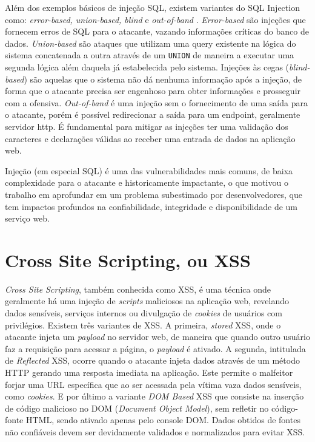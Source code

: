 Além dos exemplos básicos de injeção SQL, existem variantes \cite{bach_owasp2020understanding} do SQL Injection como: \textit{error-based, union-based, blind} e \textit{out-of-band} \cite{out_of_band_sql_invicti}. \textit{Error-based} são injeções que fornecem erros de SQL para o atacante, vazando informações críticas do banco de dados. \textit{Union-based} são ataques que utilizam uma query existente na lógica do sistema concatenada a outra através de um \verb+UNION+ de maneira a executar uma segunda lógica além daquela já estabelecida pelo sistema. Injeções às cegas (\textit{blind-based}) são aquelas que o sistema não dá nenhuma informação após a injeção, de forma que o atacante precisa ser engenhoso para obter informações e prosseguir com a ofensiva. \textit{Out-of-band} é uma injeção sem o fornecimento de uma saída para o atacante, porém é possível redirecionar a saída para um endpoint, geralmente servidor http.
É fundamental para mitigar as injeções ter uma validação dos caracteres e declarações válidas ao receber uma entrada de dados na aplicação web.

Injeção (em especial SQL) é uma das vulnerabilidades mais comuns, de baixa complexidade para o atacante e historicamente impactante, o que motivou o trabalho em aprofundar em um problema subestimado por desenvolvedores, que tem impactos profundos na confiabilidade, integridade e disponibilidade de um serviço web.

\section{Cross Site Scripting, ou XSS}
\textit{Cross Site Scripting}, também conhecida como XSS, é uma técnica onde geralmente há uma injeção de \textit{scripts} maliciosos na aplicação web, revelando dados sensíveis, serviços internos ou divulgação de \textit{cookies} de usuários com privilégios.
Existem três variantes de XSS. A primeira, \textit{stored} XSS, onde o atacante injeta um \textit{payload} no servidor web, de maneira que quando outro usuário faz a requisição para acessar a página, o \textit{payload} é ativado. A segunda, intitulada de \textit{Reflected} XSS, ocorre quando o atacante injeta dados através de um método HTTP gerando uma resposta imediata na aplicação. Este permite o malfeitor forjar uma URL específica que ao ser acessada pela vítima vaza dados sensíveis, como \textit{cookies}. E por último a variante \textit{DOM Based} XSS que consiste na inserção de código malicioso no DOM (\textit{Document Object Model}), sem refletir no código-fonte HTML, sendo ativado apenas pelo console DOM.
Dados obtidos de fontes não confiáveis devem ser devidamente validados e normalizados para evitar XSS.


